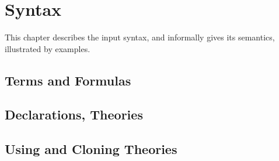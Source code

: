 \chapter{Syntax}

This chapter describes the input syntax, and informally gives its semantics,
illustrated by examples.

\section{Terms and Formulas}

\section{Declarations, Theories}

\section{Using and Cloning Theories}

